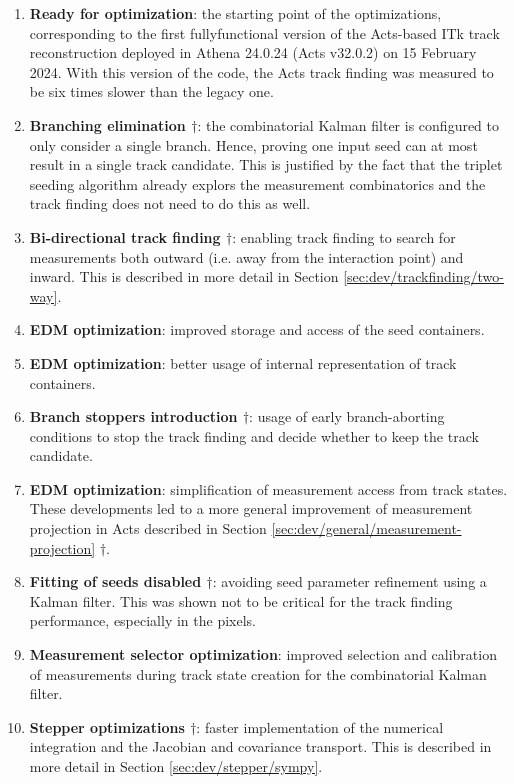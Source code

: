 \begin{enumerate}
    \item \textbf{Ready for optimization}: the starting point of the optimizations, corresponding to the first  fullyfunctional version of the Acts-based ITk track reconstruction deployed in Athena 24.0.24 (Acts v32.0.2) on 15 February 2024. With this version of the code, the Acts track finding was measured to be six times slower than the legacy one.
    \item \textbf{Branching elimination $\dagger$}: the combinatorial Kalman filter is configured to only consider a single branch. Hence, proving one input seed can at most result in a single track candidate. This is justified by the fact that the triplet seeding algorithm already explors the measurement combinatorics and the track finding does not need to do this as well.
    \item \textbf{Bi-directional track finding $\dagger$}: enabling track finding to search for measurements both outward (i.e. away from the interaction point) and inward. This is described in more detail in Section \ref{sec:dev/trackfinding/two-way}.
    \item \textbf{EDM optimization}: improved storage and access of the seed containers.
    \item \textbf{EDM optimization}: better usage of internal representation of track containers.
    \item \textbf{Branch stoppers introduction $\dagger$}: usage of early branch-aborting conditions to stop the track finding and decide whether to keep the track candidate.
    \item \textbf{EDM optimization}: simplification of measurement access from track states. These developments led to a more general improvement of measurement projection in Acts described in Section \ref{sec:dev/general/measurement-projection} $\dagger$.
    \item \textbf{Fitting of seeds disabled $\dagger$}: avoiding seed parameter refinement using a Kalman filter. This was shown not to be critical for the track finding performance, especially in the pixels.
    \item \textbf{Measurement selector optimization}: improved selection and calibration of measurements during track state creation for the combinatorial Kalman filter.
    \item \textbf{Stepper optimizations $\dagger$}: faster implementation of the numerical integration and the Jacobian and covariance transport. This is described in more detail in Section \ref{sec:dev/stepper/sympy}.

\end{enumerate}

